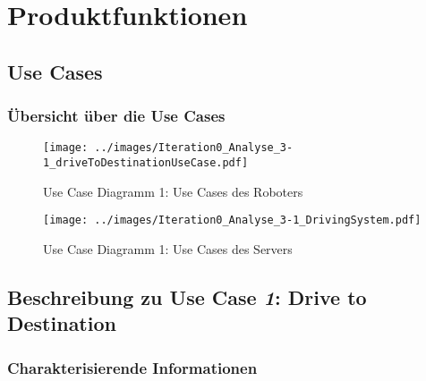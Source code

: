 \documentclass[includeheaders]{scrartcl}
\begin{document}
	\pagebreak

	\section{Produktfunktionen}

		\subsection{Use Cases}
		
		\subsubsection{Übersicht über die Use Cases}
		
			\begin{figure}[H]
				\centering
				\texttt{[image: ../images/Iteration0\_Analyse\_3-1\_driveToDestinationUseCase.pdf]}
				\caption{Use Case Diagramm 1: Use Cases des Roboters}
				\label{fig:3-1-robot-use-cases}
			\end{figure}

			\begin{figure}[H]
				\centering
				\texttt{[image: ../images/Iteration0\_Analyse\_3-1\_DrivingSystem.pdf]}
				\caption{Use Case Diagramm 1: Use Cases des Servers}
				\label{fig:3-1-server-use-cases}
			\end{figure}


		\pagebreak

		\subsection{Beschreibung zu Use Case \emph{1}: Drive to Destination}

			\subsubsection*{Charakterisierende Informationen}
\end{document}
